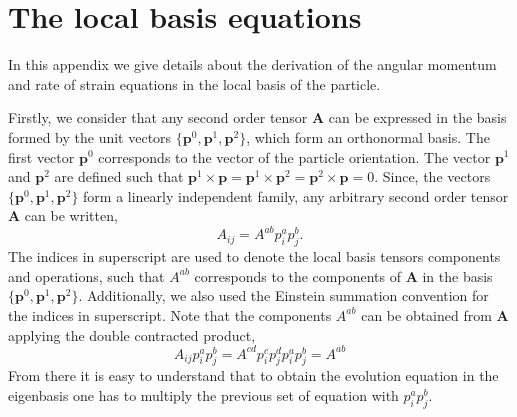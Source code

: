 



\section{The local basis equations}
\label{ap:local_basis_eq}

In this appendix we give details about the derivation of the angular momentum and rate of strain equations in the local basis of the particle. 

Firstly, we consider that any second order tensor $\textbf{A}$ can be expressed in the basis formed by the unit vectors $\{\textbf{p}^0,\textbf{p}^1,\textbf{p}^2\}$, which form an orthonormal basis. 
The first vector $\textbf{p}^0$ corresponds to the vector of the particle orientation. 
The vector $\textbf{p}^1$ and $\textbf{p}^2$ are defined such that $\textbf{p}^1 \times \textbf{p} =\textbf{p}^1 \times \textbf{p}^2=\textbf{p}^2 \times \textbf{p} =0$. 
Since, the vectors $\{\textbf{p}^0,\textbf{p}^1,\textbf{p}^2\}$ form a linearly independent family, any arbitrary second order tensor  \textbf{A} can be written, 
\begin{equation}
    A_{ij}
    = 
    A^{ab}
    p_i^a
    p_j^b.
\end{equation}
The indices in superscript are used to denote the local basis tensors  components and operations, such that $A^{ab}$ corresponds to the components of \textbf{A} in the basis $\{\textbf{p}^0,\textbf{p}^1,\textbf{p}^2\}$. 
Additionally, we also used the Einstein summation convention for the indices in superscript. 
Note that the components $A^{ab}$ can be obtained from \textbf{A} applying the double contracted product,  
\begin{equation*}
    A_{ij} 
    p_i^a
    p_j^b
    = 
    A^{cd}
    p_i^c
    p_j^d
    p_i^a
    p_j^b
    = 
    A^{ab}
\end{equation*}
From there it is easy to understand that to obtain the evolution equation in the eigenbasis one has to multiply the previous set of equation with $p_i^ap_j^b$. 

